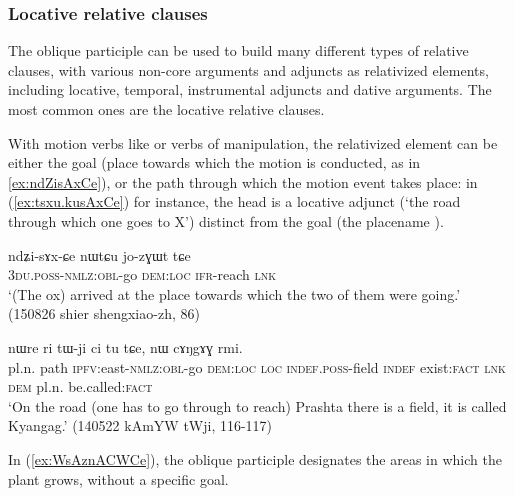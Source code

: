 \subsubsection{Locative relative clauses} \label{sec:locative.participle.relatives}
The oblique participle can be used to build many different types of relative clauses, with various non-core arguments and adjuncts as relativized elements, including locative, temporal, instrumental adjuncts and dative arguments. The most common ones are the locative relative clauses.

With  motion verbs like  or verbs of manipulation, the relativized element can be either the goal (place towards which the motion is conducted, as in \ref{ex:ndZisAxCe}), or the path through which the motion event takes place: in (\ref{ex:tsxu.kusAxCe}) for instance, the head  is a locative adjunct (`the road through which one goes to X') distinct from the goal (the placename ).

\begin{exe}
\ex \label{ex:ndZisAxCe}
\gll ndʑi-sɤx-ɕe nɯtɕu jo-zɣɯt tɕe \\
\textsc{3du}.\textsc{poss}-\textsc{nmlz}:\textsc{obl}-go \textsc{dem}:\textsc{loc} \textsc{ifr}-reach \textsc{lnk} \\
\glt  `(The ox) arrived at the place towards which the two of them were going.' (150826 shier shengxiao-zh, 86)
\end{exe}

\begin{exe}
\ex \label{ex:tsxu.kusAxCe}
 nɯre ri tɯ-ji ci tu tɕe, nɯ cɤŋgɤɣ rmi. \\
pl.n. path \textsc{ipfv}:east-\textsc{nmlz}:\textsc{obl}-go \textsc{dem}:\textsc{loc} \textsc{loc} \textsc{indef}.\textsc{poss}-field \textsc{indef} exist:\textsc{fact} \textsc{lnk} \textsc{dem} pl.n. be.called:\textsc{fact} \\
\glt  `On the road (one has to go through to reach) Prashta there is a field, it is called Kyangag.' (140522 kAmYW tWji, 116-117)
\end{exe}

In (\ref{ex:WsAznACWCe}), the oblique participle designates the areas in which the plant grows, without a specific goal.

